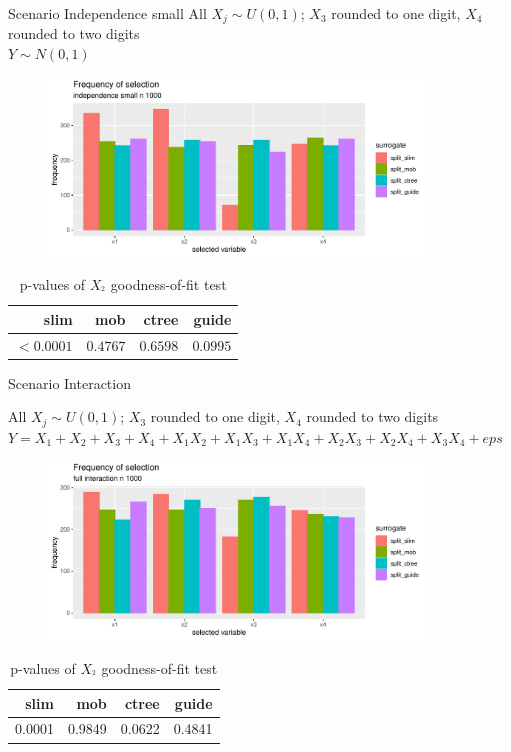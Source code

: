 \documentclass[9pt, xcolor=table]{beamer}
\begin{document}
\begin{frame}{Scenario Independence small}
All $X_j \sim U(0,1)$; $X_3$ rounded to one digit, $X_4$ rounded to two digits\\
$Y \sim N(0,1)$
\begin{figure}
    \includegraphics[width=10cm]{Figures/simulations/batchtools/selection_bias_general/independence_small_n1000.pdf}
\end{figure}

\begin{table}
\begin{tabular}[t]{r|r|r|r}
\hline
slim & mob & ctree & guide\\
\hline
$< 0.0001$ & $0.4767$ & $0.6598$ & $0.0995$\\
\hline
\end{tabular}
\caption{p-values of $X_^2$ goodness-of-fit test}
\end{table}

\end{frame}

\begin{frame}{Scenario Interaction}

All $X_j \sim U(0,1)$; $X_3$ rounded to one digit, $X_4$ rounded to two digits\\
$Y = X_1 + X_2 + X_3 + X_4 + X_1 X_2 + X_1 X_3 + X_1 X_4 + X_2 X_3 + X_2 X_4 + X_3 X_4 + eps$
\begin{figure}
    \includegraphics[width=10cm]{Figures/simulations/batchtools/selection_bias_general/full_interaction_n1000.pdf}
\end{figure}

\begin{table}
\centering
\begin{tabular}[t]{r|r|r|r}
\hline
slim & mob & ctree & guide\\
\hline
0.0001 & 0.9849 & 0.0622 & 0.4841\\
\hline
\end{tabular}
\caption{p-values of $X_^2$ goodness-of-fit test}
\end{table}
\end{frame}
\end{document}
